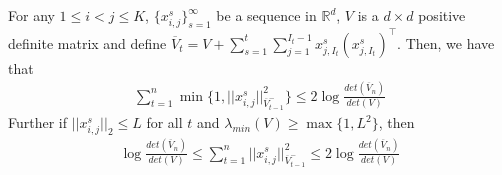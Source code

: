 \begin{lemma}
	\label{lem:x_norm}
	For any $1 \le i < j \le K$, $\{x_{i,j}^s\}_{s=1}^\infty$ be a sequence in $\mathbb{R}^d$, $V$ is a $d \times d$ positive definite matrix and define $\overline{V}_t = V + \sum_{s=1}^{t}\sum_{j=1}^{I_t-1}x_{j, I_t}^s(x_{j, I_t}^s)^\top$. Then, we have that 
	\begin{align*}
	\sum_{t=1}^n \min\{1, ||x_{i,j}^s||_{\overline{V}_{t-1}^-}^2\} \le 2\log\frac{det(\overline{V}_n)}{det(V)}
	\end{align*}
	Further if $||x_{i,j}^s||_2 \le L$ for all $t$ and $\lambda_{min}(V) \ge \max\{1, L^2\}$, then
	\begin{align*}
	\log\frac{det(\overline{V}_n)}{det(V)} \le \sum_{t=1}^n ||x_{i,j}^s||_{\overline{V}_{t-1}^-}^2 \le 2\log\frac{det(\overline{V}_n)}{det(V)}
	\end{align*}
\end{lemma}


